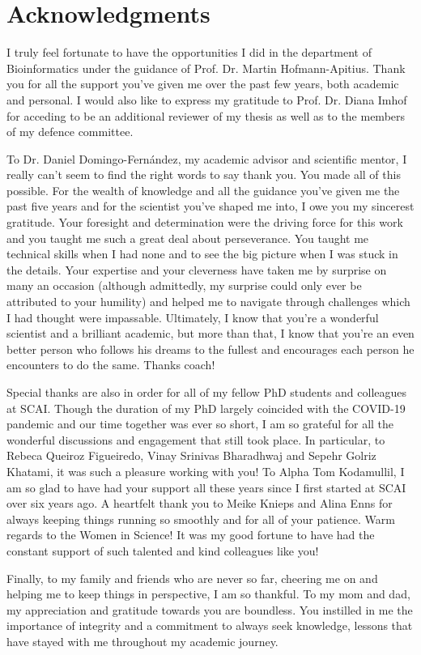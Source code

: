 \chapter*{Acknowledgments}

I truly feel fortunate to have the opportunities I did in the department of Bioinformatics under the guidance of Prof. Dr. Martin Hofmann-Apitius. Thank you for all the support you've given me over the past few years, both academic and personal. I would also like to express my gratitude to Prof. Dr. Diana Imhof for acceding to be an additional reviewer of my thesis as well as to the members of my defence committee.

To Dr. Daniel Domingo-Fernández, my academic advisor and scientific mentor, I really can’t seem to find the right words to say thank you. You made all of this possible. For the wealth of knowledge and all the guidance you’ve given me the past five years and for the scientist you’ve shaped me into, I owe you my sincerest gratitude. Your foresight and determination were the driving force for this work and you taught me such a great deal about perseverance. You taught me technical skills when I had none and to see the big picture when I was stuck in the details. Your expertise and your cleverness have taken me by surprise on many an occasion (although admittedly, my surprise could only ever be attributed to your humility) and helped me to navigate through challenges which I had thought were impassable. Ultimately, I know that you’re a wonderful scientist and a brilliant academic, but more than that, I know that you're an even better person who follows his dreams to the fullest and encourages each person he encounters to do the same. Thanks coach!

Special thanks are also in order for all of my fellow PhD students and colleagues at SCAI. Though the duration of my PhD largely coincided with the COVID-19 pandemic and our time together was ever so short, I am so grateful for all the wonderful discussions and engagement that still took place. In particular, to Rebeca Queiroz Figueiredo, Vinay Srinivas Bharadhwaj and Sepehr Golriz Khatami, it was such a pleasure working with you! To Alpha Tom Kodamullil, I am so glad to have had your support all these years since I first started at SCAI over six years ago. A heartfelt thank you to Meike Knieps and Alina Enns for always keeping things running so smoothly and for all of your patience. Warm regards to the Women in Science! It was my good fortune to have had the constant support of such talented and kind colleagues like you!

Finally, to my family and friends who are never so far, cheering me on and helping me to keep things in perspective, I am so thankful. To my mom and dad, my appreciation and gratitude towards you are boundless. You instilled in me the importance of integrity and a commitment to always seek knowledge, lessons that have stayed with me throughout my academic journey.



